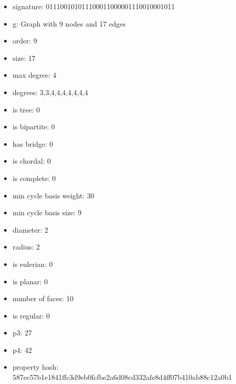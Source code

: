 \newpage
\begin{figure}
\end{figure}
\begin{itemize}
\item signature: 011100101011100011000001110010001011
\item g: Graph with 9 nodes and 17 edges
\item order: 9
\item size: 17
\item max degree: 4
\item degrees: 3,3,4,4,4,4,4,4,4
\item is tree: 0
\item is bipartite: 0
\item has bridge: 0
\item is chordal: 0
\item is complete: 0
\item min cycle basis weight: 30
\item min cycle basis size: 9
\item diameter: 2
\item radius: 2
\item is eulerian: 0
\item is planar: 0
\item number of faces: 10
\item is regular: 0
\item p3: 27
\item p4: 42
\item property hash: 587ec57b1e1841ffc3d9eb0fcfbe2a6d08cd332afe8d4ff07b410ab88c12a0b1
\end{itemize}
